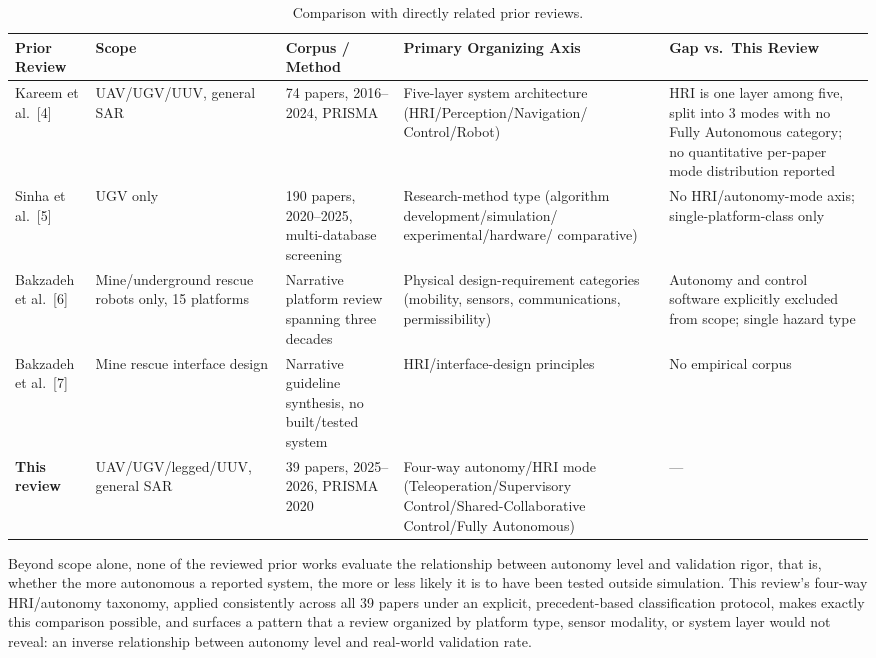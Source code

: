 \documentclass[journal]{IEEEtran}
\begin{document}
\begin{table}[t]
\caption{Comparison with directly related prior reviews.}
\label{tab:prior-reviews}
\centering
\footnotesize
\begin{tabular}{@{}p{}@{\hspace{4pt}}p{}@{\hspace{4pt}}p{}@{\hspace{4pt}}p{}@{\hspace{4pt}}p{}@{}}
\toprule
\textbf{Prior Review} & \textbf{Scope} & \textbf{Corpus / Method} & \textbf{Primary Organizing Axis} & \textbf{Gap vs.\ This Review} \\
\midrule
Kareem et al.\ [4] & UAV/UGV/UUV, general SAR & 74 papers, 2016--2024, PRISMA & Five-layer system architecture (HRI/Perception/Navigation/ Control/Robot) & HRI is one layer among five, split into 3 modes with no Fully Autonomous category; no quantitative per-paper mode distribution reported \\
\addlinespace
Sinha et al.\ [5] & UGV only & 190 papers, 2020--2025, multi-database screening & Research-method type (algorithm development/simulation/ experimental/hardware/ comparative) & No HRI/autonomy-mode axis; single-platform-class only \\
\addlinespace
Bakzadeh et al.\ [6] & Mine/underground rescue robots only, 15 platforms & Narrative platform review spanning three decades & Physical design-requirement categories (mobility, sensors, communications, permissibility) & Autonomy and control software explicitly excluded from scope; single hazard type \\
\addlinespace
Bakzadeh et al.\ [7] & Mine rescue interface design & Narrative guideline synthesis, no built/tested system & HRI/interface-design principles & No empirical corpus \\
\addlinespace
\textbf{This review} & UAV/UGV/legged/UUV, general SAR & 39 papers, 2025--2026, PRISMA 2020 & Four-way autonomy/HRI mode (Teleoperation/Supervisory Control/Shared-Collaborative Control/Fully Autonomous) & --- \\
\bottomrule
\end{tabular}
\end{table}


Beyond scope alone, none of the reviewed prior works evaluate the relationship between autonomy level and validation rigor, that is, whether the more autonomous a reported system, the more or less likely it is to have been tested outside simulation. This review's four-way HRI/autonomy taxonomy, applied consistently across all 39 papers under an explicit, precedent-based classification protocol, makes exactly this comparison possible, and surfaces a pattern that a review organized by platform type, sensor modality, or system layer would not reveal: an inverse relationship between autonomy level and real-world validation rate.
\end{document}
